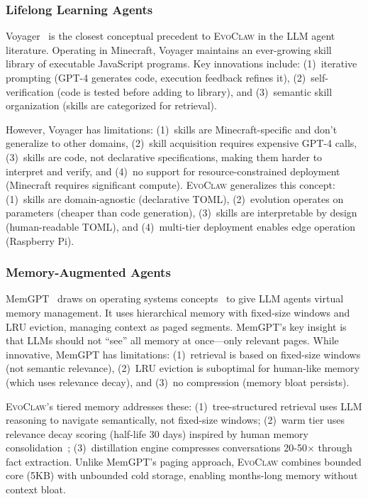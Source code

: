 \documentclass{article}
\newcommand{\evoclaw}{\textsc{EvoClaw}}
\begin{document}
\subsubsection{Lifelong Learning Agents}

Voyager~\cite{wang2023voyager} is the closest conceptual precedent to \evoclaw{} in the LLM agent literature. Operating in Minecraft, Voyager maintains an ever-growing skill library of executable JavaScript programs. Key innovations include: (1)~iterative prompting (GPT-4 generates code, execution feedback refines it), (2)~self-verification (code is tested before adding to library), and (3)~semantic skill organization (skills are categorized for retrieval). 

However, Voyager has limitations: (1)~skills are Minecraft-specific and don't generalize to other domains, (2)~skill acquisition requires expensive GPT-4 calls, (3)~skills are code, not declarative specifications, making them harder to interpret and verify, and (4)~no support for resource-constrained deployment (Minecraft requires significant compute). \evoclaw{} generalizes this concept: (1)~skills are domain-agnostic (declarative TOML), (2)~evolution operates on parameters (cheaper than code generation), (3)~skills are interpretable by design (human-readable TOML), and (4)~multi-tier deployment enables edge operation (Raspberry Pi).

\subsubsection{Memory-Augmented Agents}

MemGPT~\cite{packer2023memgpt} draws on operating systems concepts~\cite{silberschatz2014operating} to give LLM agents virtual memory management. It uses hierarchical memory with fixed-size windows and LRU eviction, managing context as paged segments. MemGPT's key insight is that LLMs should not ``see'' all memory at once---only relevant pages. While innovative, MemGPT has limitations: (1)~retrieval is based on fixed-size windows (not semantic relevance), (2)~LRU eviction is suboptimal for human-like memory (which uses relevance decay), and (3)~no compression (memory bloat persists).

\evoclaw{}'s tiered memory addresses these: (1)~tree-structured retrieval uses LLM reasoning to navigate semantically, not fixed-size windows; (2)~warm tier uses relevance decay scoring (half-life 30 days) inspired by human memory consolidation~\cite{atkinson1971human}; (3)~distillation engine compresses conversations 20-50$\times$ through fact extraction. Unlike MemGPT's paging approach, \evoclaw{} combines bounded core (5KB) with unbounded cold storage, enabling months-long memory without context bloat.
\end{document}
